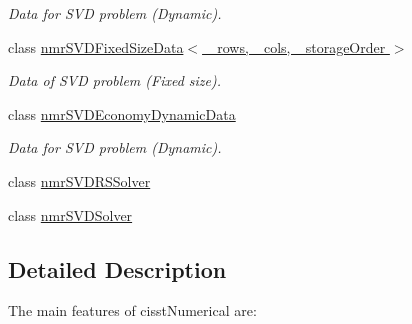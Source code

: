 \begin{DoxyCompactItemize}
\begin{DoxyCompactList}\small\item\em Data for S\-V\-D problem (Dynamic). \end{DoxyCompactList}\item 
class \hyperlink{classnmr_s_v_d_fixed_size_data}{nmr\-S\-V\-D\-Fixed\-Size\-Data$<$ \-\_\-rows, \-\_\-cols, \-\_\-storage\-Order $>$}
\begin{DoxyCompactList}\small\item\em Data of S\-V\-D problem (Fixed size). \end{DoxyCompactList}\item 
class \hyperlink{classnmr_s_v_d_economy_dynamic_data}{nmr\-S\-V\-D\-Economy\-Dynamic\-Data}
\begin{DoxyCompactList}\small\item\em Data for S\-V\-D problem (Dynamic). \end{DoxyCompactList}\item 
class \hyperlink{classnmr_s_v_d_r_s_solver}{nmr\-S\-V\-D\-R\-S\-Solver}
\item 
class \hyperlink{classnmr_s_v_d_solver}{nmr\-S\-V\-D\-Solver}
\end{DoxyCompactItemize}


\subsection{Detailed Description}
The main features of cisst\-Numerical are\-:


